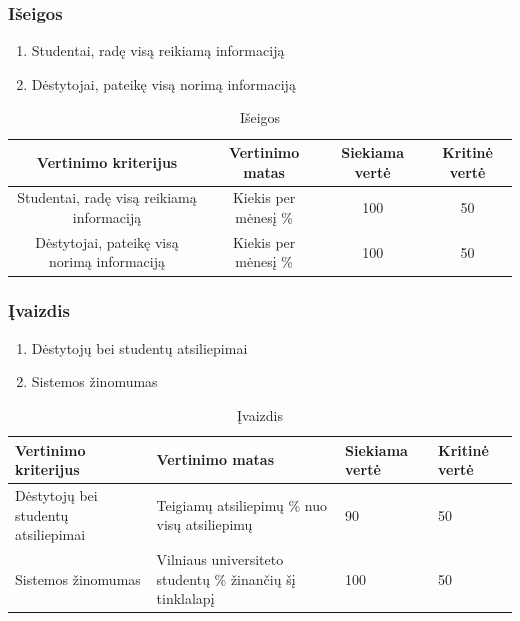 \documentclass{VUMIFPSkursinis}
\begin{document}
\subsubsection{Išeigos}
\begin{enumerate}
	\item Studentai, radę visą reikiamą informaciją
	\item Dėstytojai, pateikę visą norimą informaciją
\end{enumerate}
\begin{table}[H]
	\centering
	\caption{Išeigos}
	{\begin{tabular}{|c|c|c|c|} \hline
			Vertinimo kriterijus & Vertinimo matas & Siekiama vertė & Kritinė vertė \\
			\hline
			Studentai, radę visą reikiamą informaciją & Kiekis per mėnesį \% & 100 & 50 \\
			\hline
			Dėstytojai, pateikę visą norimą informaciją & Kiekis per mėnesį \% & 100 & 50 \\
			\hline
	\end{tabular}}
	\label{iseigos}
\end{table}
	\subsubsection{Įvaizdis}
\begin{enumerate}
	\item Dėstytojų bei studentų atsiliepimai
	\item Sistemos žinomumas
\end{enumerate}
\begin{table}[H]
	\centering
	\caption{Įvaizdis}
	{\begin{tabular}{|p{5cm}|p{}|p{2cm}|p{2cm}|}\hline
			Vertinimo kriterijus & Vertinimo matas & Siekiama vertė & Kritinė vertė \\
			\hline
			Dėstytojų bei studentų atsiliepimai & Teigiamų atsiliepimų \% nuo visų atsiliepimų & 90 & 50 \\
			\hline
			Sistemos žinomumas & Vilniaus universiteto studentų \% žinančių šį tinklalapį & 100 & 50 \\
			\hline
	\end{tabular}}
	\label{ivaizdis}
\end{table}
\end{document}
